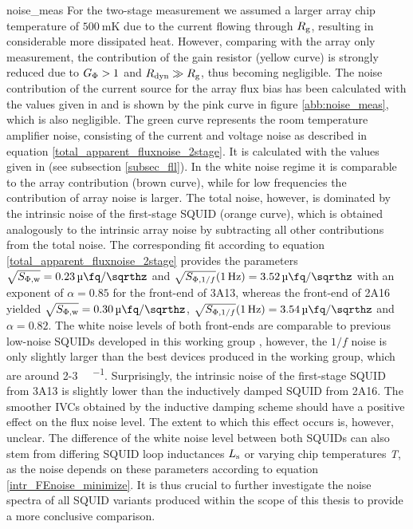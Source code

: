 {noise_meas}
For the two-stage measurement we assumed a larger array chip temperature of $\qty{500}{\milli\kelvin}$ due to the current flowing through $R_{\rm g}$, resulting in considerable more dissipated heat. However, comparing with the array only measurement, the contribution of the gain resistor (yellow curve) is strongly reduced due to $G_{\rm \Phi}>1$ and $R_{\rm dyn}\gg R_{\rm g}$, thus becoming negligible. The noise contribution of the current source for the array flux bias has been calculated with the values given in \cite{Kaap2020} and is shown by the pink curve in figure \ref{abb:noise_meas}, which is also negligible. The green curve represents the room temperature amplifier noise, consisting of the current and voltage noise as described in equation \ref{total_apparent_fluxnoise_2stage}. It is calculated with the values given in \cite{Drung2006} (see subsection \ref{subsec_fll}). In the white noise regime it is comparable to the array contribution (brown curve), while for low frequencies the contribution of array noise is larger. The total noise, however, is dominated by the intrinsic noise of the first-stage SQUID (orange curve), which is obtained analogously to the intrinsic array noise by subtracting all other contributions from the total noise. The corresponding fit according to equation \ref{total_apparent_fluxnoise_2stage} provides the parameters $\sqrt{S_{\rm \Phi,w}}=\qty{0.23}{\micro\fq\per\sqrthz}$ and $\sqrt{S_{{\rm \Phi},1/f}}(\qty{1}{\Hz})=\qty{3.52}{\micro\fq\per\sqrthz}$ with an exponent of $\alpha=0.85$ for the front-end of 3A13, whereas the front-end of 2A16 yielded $\sqrt{S_{\rm \Phi,w}}=\qty{0.30}{\micro\fq\per\sqrthz}$, $\sqrt{S_{{\rm \Phi},1/f}}(\qty{1}{\Hz})=\qty{3.54}{\micro\fq\per\sqrthz}$ and $\alpha=0.82$. The white noise levels of both front-ends are comparable to previous low-noise SQUIDs developed in this working group \cite{Ferring2015}, however, the $1/f$ noise is only slightly larger than the best devices produced in the working group, which are around 2-3 \unit{\micro\fq\per\sqrthz}. Surprisingly, the intrinsic noise of the first-stage SQUID from 3A13 is slightly lower than the inductively damped SQUID from 2A16. The smoother IVCs obtained by the inductive damping scheme should have a positive effect on the flux noise level. The extent to which this effect occurs is, however, unclear. The difference of the white noise level between both SQUIDs can also stem from differing SQUID loop inductances $L_{\rm s}$ or varying chip temperatures \textit{T}, as the noise depends on these parameters according to equation \ref{intr_FEnoise_minimize}. It is thus crucial to further investigate the noise spectra of all SQUID variants produced within the scope of this thesis to provide a more conclusive comparison.


